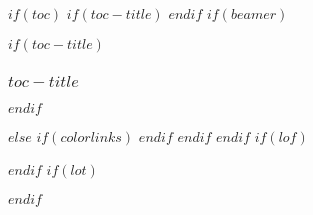$if(toc)$
$if(toc-title)$
\renewcommand*\contentsname{$toc-title$}
$endif$
$if(beamer)$
\begin{frame}[allowframebreaks]
$if(toc-title)$
  \frametitle{$toc-title$}
$endif$
  \tableofcontents[hideallsubsections]
\end{frame}
$else$
{
$if(colorlinks)$
\hypersetup{linkcolor=$if(toccolor)$$toccolor$$else$$endif$}
$endif$
%
\pagestyle{plain}%
\setcounter{tocdepth}{$toc-depth$}
\tableofcontents
{}
}
$endif$
$endif$
$if(lof)$
\listoffigures
$endif$
$if(lot)$
\listoftables
$endif$